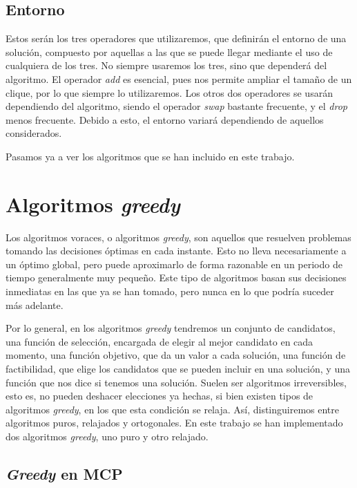 \subsection{Entorno}

Estos serán los tres operadores que utilizaremos, que definirán el entorno de una solución, compuesto por
aquellas a las que se puede llegar mediante el uso de cualquiera de los tres. No siempre usaremos los
tres, sino que dependerá del algoritmo. El operador \textit{add} es esencial, pues nos permite ampliar
el tamaño de un clique, por lo que siempre lo utilizaremos. Los otros dos operadores se usarán dependiendo
del algoritmo, siendo el operador \textit{swap} bastante frecuente, y el \textit{drop} menos frecuente.
Debido a esto, el entorno variará dependiendo de aquellos considerados.

Pasamos ya a ver los algoritmos que se han incluido en este trabajo.

\section{Algoritmos \textit{greedy}}\label{greedy}

Los algoritmos voraces, o algoritmos \textit{greedy}, son aquellos que resuelven problemas tomando
las decisiones óptimas en cada instante. Esto no lleva necesariamente a un óptimo global, pero puede
aproximarlo de forma razonable en un periodo de tiempo generalmente muy pequeño. Este tipo de algoritmos
basan sus decisiones inmediatas en las que ya se han tomado, pero nunca en lo que podría suceder más
adelante.

Por lo general, en los algoritmos \textit{greedy} tendremos un conjunto de candidatos, una función
de selección, encargada de elegir al mejor candidato en cada momento, una función objetivo, que
da un valor a cada solución, una función de factibilidad, que elige los candidatos que se pueden incluir
en una solución, y una función que nos dice si tenemos una solución. Suelen ser algoritmos irreversibles,
esto es, no pueden deshacer elecciones ya hechas, si bien existen tipos de algoritmos
\textit{greedy}, en los que esta condición se relaja. Así, distinguiremos entre algoritmos
puros, relajados y ortogonales. En este trabajo se han implementado dos algoritmos \textit{greedy},
uno puro y otro relajado.

\subsection{\textit{Greedy} en MCP}

